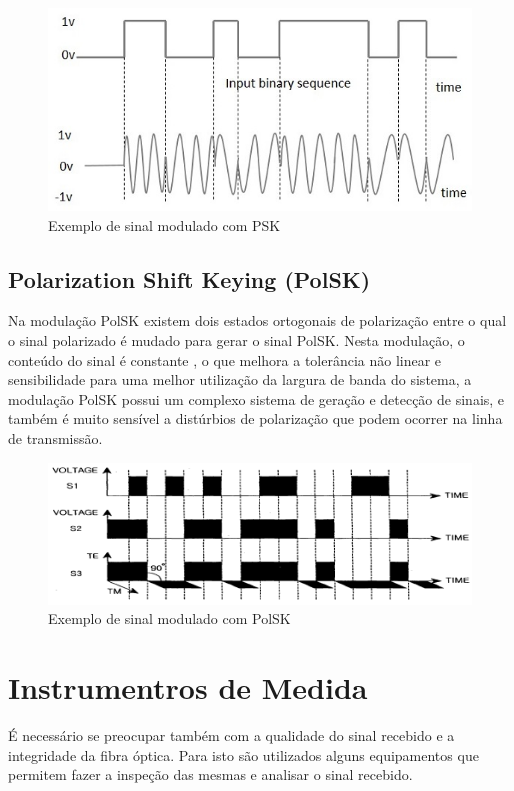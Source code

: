\documentclass[article]{IEEEtran}
\begin{document}
\begin{figure}[h]
\includegraphics[width=\columnwidth]{psk.png}
\caption{Exemplo de sinal modulado com PSK}
\end{figure}

\subsection{Polarization Shift Keying (PolSK)}
Na modulação PolSK existem dois estados ortogonais de polarização entre o qual o sinal polarizado é mudado para gerar o sinal PolSK. Nesta modulação, o conteúdo do sinal é constante , o que melhora a tolerância não linear e sensibilidade para uma melhor utilização da largura de banda do sistema, a modulação PolSK possui um complexo sistema de geração e detecção de sinais, e também é muito sensível a distúrbios de polarização que podem ocorrer na linha de transmissão.\cite{MODULATION}
\begin{figure}[h]
\includegraphics[width=\columnwidth]{polsk.png}
\caption{Exemplo de sinal modulado com PolSK}
\end{figure}

\section{Instrumentros de Medida}
É necessário se preocupar também com a qualidade do sinal recebido e a integridade da fibra óptica. Para isto são utilizados alguns equipamentos que permitem fazer a inspeção das mesmas e analisar o sinal recebido.
\end{document}
